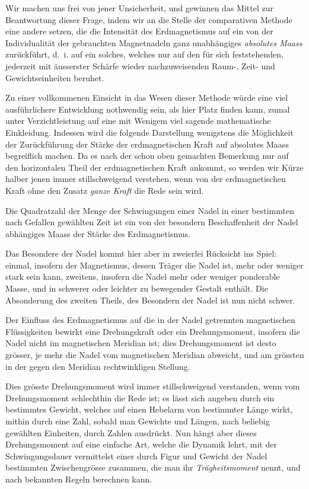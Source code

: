 \documentclass[12pt,a4paper]{article}
\begin{document}
\bigskip

Wir machen uns frei von jener Unsicherheit, und gewinnen das Mittel zur Beantwortung dieser Frage, indem wir an die Stelle der comparativen Methode eine andere setzen, die die Intensität des Erdmagnetismus auf ein von der Individualität der gebrauchten Magnetnadeln ganz unabhängiges \textit{absolutes Maass} zurückführt, d.~i. auf ein solches, welches nur auf den für sich feststehenden, jederzeit mit äusserster Schärfe wieder nachzuweisenden Raum-, Zeit- und Gewichtseinheiten beruhet.

Zu einer vollkommenen Einsicht in das Wesen dieser Methode würde eine viel ausführlichere Entwicklung nothwendig sein, als hier Platz finden kann, zumal unter Verzichtleistung auf eine mit Wenigem viel sagende mathematische Einkleidung. Indessen wird die folgende Darstellung wenigstens die Möglichkeit der Zurückführung der Stärke der erdmagnetischen Kraft auf absolutes Maass begreiflich machen. Da es nach der schon oben gemachten Bemerkung nur auf den horizontalen Theil der erdmagnetischen Kraft ankommt, so werden wir Kürze halber jenen immer stillschweigend verstehen, wenn von der erdmagnetischen Kraft ohne den Zusatz \textit{ganze Kraft} die Rede sein wird.

\bigskip

Die Quadratzahl der Menge der Schwingungen einer Nadel in einer bestimmten nach Gefallen gewählten Zeit ist ein von der besondern Beschaffenheit der Nadel abhängiges Maass der Stärke des Erdmagnetismus.

Das Besondere der Nadel kommt hier aber in zweierlei Rücksicht ins Spiel: einmal, insofern der Magnetismus, dessen Träger die Nadel ist, mehr oder weniger stark sein kann, zweitens, insofern die Nadel mehr oder weniger ponderable Masse, und in schwerer oder leichter zu bewegender Gestalt enthält. Die Absonderung des zweiten Theils, des Besondern der Nadel ist nun nicht schwer.

Der Einfluss des Erdmagnetismus auf die in der Nadel getrennten magnetischen Flüssigkeiten bewirkt eine Drehungskraft oder ein Drehungsmoment, insofern die Nadel nicht im magnetischen Meridian ist; dies Drehungsmoment ist desto grösser, je mehr die Nadel vom magnetischen Meridian abweicht, und am grössten in der gegen den Meridian rechtwinkligen Stellung.

Dies grösste Drehungsmoment wird immer stillschweigend verstanden, wenn vom Drehungsmoment schlechthin die Rede ist; es lässt sich angeben durch ein bestimmtes Gewicht, welches auf einen Hebelarm von bestimmter Länge wirkt, mithin durch eine Zahl, sobald man Gewichte und Längen, nach beliebig gewählten Einheiten, durch Zahlen ausdrückt. Nun hängt aber dieses Drehungsmoment auf eine einfache Art, welche die Dynamik lehrt, mit der Schwingungsdauer vermittelst einer durch Figur und Gewicht der Nadel bestimmten Zwischengrösse zusammen, die man ihr \textit{Trägheitsmoment} nennt, und nach bekannten Regeln berechnen kann.
\end{document}
